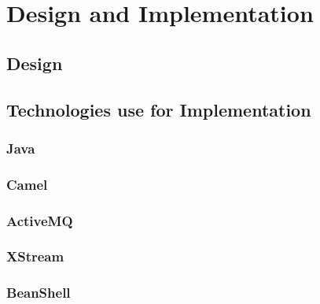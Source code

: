 \chapter{Design and Implementation}
\section{Design}
\section{Technologies use for Implementation}
\subsection{Java}
\subsection{Camel}
\subsection{ActiveMQ}
\subsection{XStream}
\subsection{BeanShell}


\newpage

